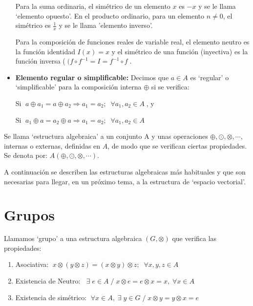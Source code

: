 \begin{itemize}
\textcolor{gris}{Para la suma ordinaria, el simétrico de un elemento $x$ es $-x$ y se le llama `elemento opuesto'. En el producto ordinario, para un elemento $n \neq 0$, el simétrico es $\frac 1 x$ y se le llama 'elemento inverso'.}

\textcolor{gris}{Para la composición de funciones reales de variable real, el elemento neutro es la función identidad $I(x)=x$ y el simétrico de una función (inyectiva) es la función inversa ($\;(f \circ f^{-1}=I=f^{-1} \circ f \;$.}

\item \textbf{Elemento regular o simplificable:} Decimos que $a\in A$ es `regular' o `simplificable' para la composición interna $\oplus$ si se verifica:

\hspace{10mm} Si $\; a\oplus a_1 = a \oplus a_2 \Rightarrow a_1=a_2; \;\;  \forall a_1, a_2 \in A\; $, y

\hspace{10mm} Si $\; a_1\oplus a = a_2 \oplus a \Rightarrow a_1=a_2; \;\;  \forall a_1, a_2 \in A\; $

\end{itemize}


\begin{defi}
Se llama `estructura algebraica' a un conjunto A y unas operaciones  $\oplus, \odot, \otimes, \cdots$, internas o externas, definidas en $A$, de modo que se verifican ciertas propiedades. Se denota por: $A(\oplus, \odot, \otimes, \cdots)$.

A continuación se describen las estructuras algebraicas más habituales y que son necesarias para llegar, en un próximo tema, a la estructura de `espacio vectorial'.
\end{defi}

\section{Grupos}

\begin{defi}
Llamamos `grupo' a una estructura algebraica $(G,\otimes)$	que verifica las propiedades:

\begin{enumerate}
\item Asociativa: $\; x\otimes (y \otimes z)=(x \otimes y) \otimes z; 	\; \; \forall x,y,z \in A$
\item Existencia de Neutro: $\;  \; \exists \; e\in A \; / \; x \otimes e = e \otimes x = x, \; \forall x\in A$	
\item Existencia de simétrico: $\; \forall x \in A,\; \exists \; y\in G\; / \; x \otimes y = y \otimes x = e$
\end{enumerate}
\end{defi}

